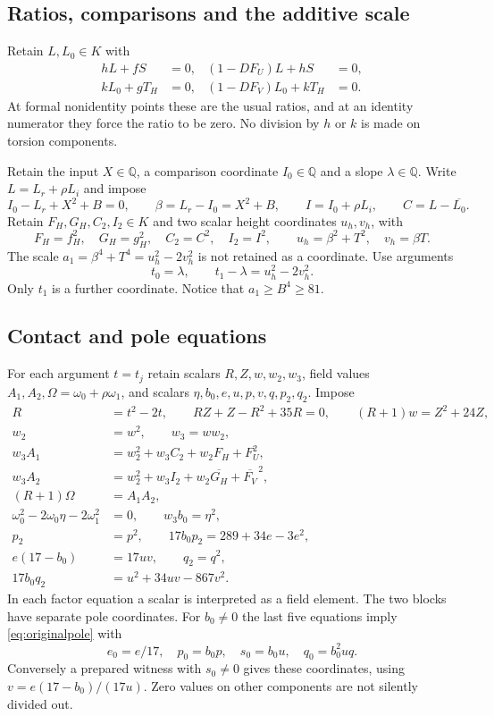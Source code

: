 \documentclass[11pt,a4paper]{article}
\newcommand{\Q}{\mathbb Q}\newcommand{\Z}{\mathbb Z}\DeclareMathOperator{\Tr}{Tr}\DeclareMathOperator{\Nm}{Nm}\DeclareMathOperator{\rad}{rad}
\begin{document}
\subsection{Ratios, comparisons and the additive scale}
Retain $L,L_0\in K$ with
\begin{align}
 hL+fS&=0,& (1-DF_U)L+hS&=0,\\
 kL_0+gT_H&=0,& (1-DF_V)L_0+kT_H&=0.\label{eq:ratios}
\end{align}
At formal nonidentity points these are the usual ratios, and at an
identity numerator they force the ratio to be zero. No division by
$h$ or $k$ is made on torsion components.

Retain the input $X\in\Q$, a comparison coordinate $I_0\in\Q$ and a
slope $\lambda\in\Q$. Write $L=L_r+\rho L_i$ and impose
\[
 I_0-L_r+X^2+B=0,
 \qquad \beta=L_r-I_0=X^2+B,
 \qquad I=I_0+\rho L_i,
 \qquad C=L-\overline{L_0}.
\]
Retain $F_H,G_H,C_2,I_2\in K$ and two scalar height coordinates
$u_h,v_h$, with
\[
 F_H=f_H^2,\quad G_H=g_H^2,\quad C_2=C^2,\quad I_2=I^2,
 \qquad u_h=\beta^2+T^2,\quad v_h=\beta T.
\]
The scale $a_1=\beta^4+T^4=u_h^2-2v_h^2$ is not retained as a
coordinate. Use arguments
\begin{equation}\label{eq:arguments}
            t_0=\lambda,\qquad t_1-\lambda=u_h^2-2v_h^2.
\end{equation}
Only $t_1$ is a further coordinate. Notice that $a_1\ge B^4\ge81$.

\subsection{Contact and pole equations}
For each argument $t=t_j$ retain scalars $R,Z,w,w_2,w_3$, field
values $A_1,A_2,\Omega=\omega_0+\rho\omega_1$, and scalars
$\eta,b_0,e,u,p,v,q,p_2,q_2$. Impose
\begin{align}
 R&=t^2-2t,\qquad RZ+Z-R^2+35R=0,\qquad (R+1)w=Z^2+24Z,\\
 w_2&=w^2,\qquad w_3=ww_2,\\
 w_3A_1&=w_2^2+w_3C_2+w_2F_H+F_U^2,\\
 w_3A_2&=w_2^2+w_3I_2+w_2\overline{G_H}+\overline{F_V}^{\,2},\\
 (R+1)\Omega&=A_1A_2,\\
 \omega_0^2-2\omega_0\eta-2\omega_1^2&=0,\qquad w_3b_0=\eta^2,\\
 p_2&=p^2,\qquad 17b_0p_2=289+34e-3e^2,\\
 e(17-b_0)&=17uv,\qquad q_2=q^2,\\
 17b_0q_2&=u^2+34uv-867v^2.\label{eq:blocks}
\end{align}
In each factor equation a scalar is interpreted as a field element.
The two blocks have separate pole coordinates.
For $b_0\ne0$ the last five equations imply \eqref{eq:originalpole}
with
\[
 e_0=e/17,\quad p_0=b_0p,\quad s_0=b_0u,\quad q_0=b_0^2u q.
\]
Conversely a prepared witness with $s_0\ne0$ gives these coordinates,
using $v=e(17-b_0)/(17u)$. Zero values on other components are not
silently divided out.
\end{document}
